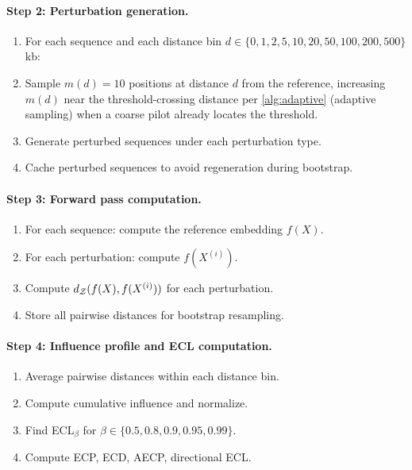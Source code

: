 \paragraph{Step 2: Perturbation generation.}
\begin{enumerate}[leftmargin=2em, label=(2.\arabic*)]
\item For each sequence and each distance bin $d \in \{0, 1, 2, 5, 10, 20, 50, 100, 200, 500\}$ kb:
\item Sample $m(d) = 10$ positions at distance $d$ from the reference, increasing $m(d)$ near the threshold-crossing distance per \cref{alg:adaptive} (adaptive sampling) when a coarse pilot already locates the threshold.
\item Generate perturbed sequences under each perturbation type.
\item Cache perturbed sequences to avoid regeneration during bootstrap.
\end{enumerate}

\paragraph{Step 3: Forward pass computation.}
\begin{enumerate}[leftmargin=2em, label=(3.\arabic*)]
\item For each sequence: compute the reference embedding $f(X)$.
\item For each perturbation: compute $f(X^{(i)})$.
\item Compute $d_{\mathcal{Z}}(f(X), f(X^{(i)}))$ for each perturbation.
\item Store all pairwise distances for bootstrap resampling.
\end{enumerate}

\paragraph{Step 4: Influence profile and ECL computation.}
\begin{enumerate}[leftmargin=2em, label=(4.\arabic*)]
\item Average pairwise distances within each distance bin.
\item Compute cumulative influence and normalize.
\item Find ECL$_\beta$ for $\beta \in \{0.5, 0.8, 0.9, 0.95, 0.99\}$.
\item Compute ECP, ECD, AECP, directional ECL.
\end{enumerate}

